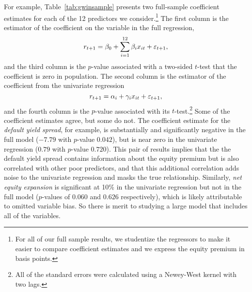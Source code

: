 \documentclass[12pt,draft]{article}
\begin{document}
For example, Table~\ref{tab:gwinsample} presents two full-sample
coefficient estimates for each of the 12 predictors we
consider.\footnote{%
  For all of our full sample results, we studentize the
  regressors to make it easier to compare coefficient estimates and we
  express the equity premium in basis points.} %
The first column is the estimator of the coefficient on the
variable in the full regression,
\begin{equation*}
  r_{t+1} = \beta_0 + \sum_{i=1}^{12} \beta_{i} x_{it} + \varepsilon_{t+1},
\end{equation*}
and the third column is the $p$-value associated with a two-sided
$t$-test that the coefficient is zero in population. The second column
is the estimator of the coefficient from the univariate regression
\begin{equation*}
  r_{t+1} = \alpha_i + \gamma_{i} x_{it} + \varepsilon_{t+1},
\end{equation*}
and the fourth column is the $p$-value associated with its
$t$-test.\footnote{%
  All of the standard errors were calculated using a Newey-West kernel
  with two lags.} %
Some of the coefficient estimates agree, but some do not. The
coefficient estimate for the \emph{default yield spread}, for example,
is substantially and significantly negative in the full model ($-7.79$
with $p$-value $0.042$), but is near zero in the univariate regression
($0.79$ with $p$-value $0.720$). This pair of results implies that the
the default yield spread contains information about the equity premium
but is also correlated with other poor predictors, and that this
additional correlation adds noise to the univariate regression
and masks the true relationship. Similarly, \emph{net equity expansion}
is significant at 10\% in the univariate regression but not in the
full model ($p$-values of $0.060$ and $0.626$ respectively), which is
likely attributable to omitted variable bias. So there is merit to
studying a large model that includes all of the variables.
\end{document}
